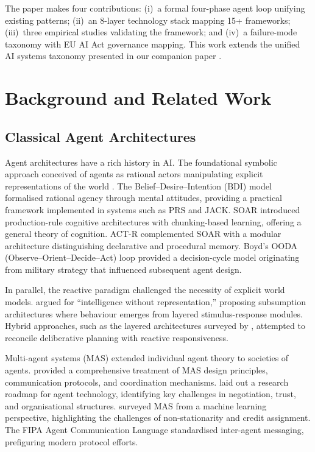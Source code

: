 \documentclass[review,authoryear]{elsarticle}
\theoremstyle{definition}
\begin{document}
The paper makes four contributions: (i)~a formal four-phase agent loop unifying existing patterns; (ii)~an 8-layer technology stack mapping 15+ frameworks; (iii)~three empirical studies validating the framework; and (iv)~a failure-mode taxonomy with EU AI Act governance mapping. This work extends the unified AI systems taxonomy presented in our companion paper \citep{mahdi2026taxonomy}.

\section{Background and Related Work}\label{sec:background}

\subsection{Classical Agent Architectures}

Agent architectures have a rich history in AI. The foundational symbolic approach conceived of agents as rational actors manipulating explicit representations of the world \citep{newell1976computer,russell2021artificial}. The Belief--Desire--Intention (BDI) model \citep{rao1995bdi} formalised rational agency through mental attitudes, providing a practical framework implemented in systems such as PRS and JACK. SOAR \citep{laird2012soar} introduced production-rule cognitive architectures with chunking-based learning, offering a general theory of cognition. ACT-R \citep{anderson2004act} complemented SOAR with a modular architecture distinguishing declarative and procedural memory. Boyd's OODA (Observe--Orient--Decide--Act) loop \citep{boyd1987ooda} provided a decision-cycle model originating from military strategy that influenced subsequent agent design.

In parallel, the reactive paradigm challenged the necessity of explicit world models. \citet{brooks1991intelligence} argued for ``intelligence without representation,'' proposing subsumption architectures where behaviour emerges from layered stimulus-response modules. Hybrid approaches, such as the layered architectures surveyed by \citet{muller1996design}, attempted to reconcile deliberative planning with reactive responsiveness.

Multi-agent systems (MAS) extended individual agent theory to societies of agents. \citet{wooldridge2009introduction} provided a comprehensive treatment of MAS design principles, communication protocols, and coordination mechanisms. \citet{jennings1998roadmap} laid out a research roadmap for agent technology, identifying key challenges in negotiation, trust, and organisational structures. \citet{stone2000multiagent} surveyed MAS from a machine learning perspective, highlighting the challenges of non-stationarity and credit assignment. The FIPA Agent Communication Language \citep{fipa2002acl} standardised inter-agent messaging, prefiguring modern protocol efforts.
\end{document}
